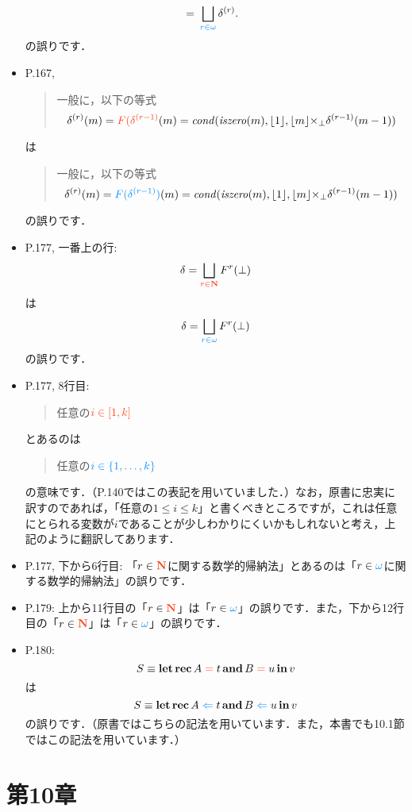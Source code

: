 \documentclass[12pt,titlepage,twoside,openright,dvipdfmx]{jsbook}
\newcommand\old[1]{%
  \textcolor[rgb]{1.0,0.25,0.1}{#1}%
  }
\newcommand\new[1]{%
  \textcolor[rgb]{0,0.55,1.0}{#1}%
  }
\theoremstyle{definition}
\begin{document}
\begin{itemize}
\begin{align*}
    ~=~ & \bigsqcup_{\new{r \in \omega}} \delta^{(r)}.
  \end{align*}
  の誤りです．
\item P.167,
  \begin{quote}
    一般に，以下の等式
    \[
      \delta^{(r)}(m) = \old{F(\delta^{(r-1)}}(m) = \SEMCOND(\ISZERO(m),\valuize{1},\valuize{m} \strict{\times} \delta^{(r-1)}(m-1))\\
    \]
  \end{quote}
  は
  \begin{quote}
    一般に，以下の等式
    \[
      \delta^{(r)}(m) = \new{F(\delta^{(r-1)})}(m) = \SEMCOND(\ISZERO(m),\valuize{1},\valuize{m} \strict{\times} \delta^{(r-1)}(m-1))\\
    \]
  \end{quote}
  の誤りです．
\item P.177, 一番上の行:
  \[
    \delta = \bigsqcup_{\old{r \in \NUM}} F^r(\bot)
  \]
  は
  \[
    \delta = \bigsqcup_{\new{r \in \omega}} F^r(\bot)
  \]
  の誤りです．
\item P.177, 8行目:
  \begin{quote}
    任意の$\old{i \in [1,k]}$
  \end{quote}
  とあるのは
  \begin{quote}
    任意の$\new{i \in \set{1,\dots,k}}$
  \end{quote}
  の意味です．（P.140ではこの表記を用いていました．）なお，原書に忠実に訳すのであれば，「任意の$1 \le i \le k$」と書くべきところですが，これは任意にとられる変数が$i$であることが少しわかりにくいかもしれないと考え，上記のように翻訳してあります．
\item P.177, 下から6行目:
  「$r \in \old{\NUM}$に関する数学的帰納法」とあるのは「$r \in \new{\omega}$に関する数学的帰納法」の誤りです．
\item P.179:
  上から11行目の「$r \in \old{\NUM}$」は「$r \in \new{\omega}$」の誤りです．また，下から12行目の「$r \in \old{\NUM}$」は「$r \in \new{\omega}$」の誤りです．
\item P.180:
  \[
    S \equiv \BFLET \BFREC A \old{{}={}} t \BFAND B \old{{}={}} u \BFIN v
  \]
  は
  \[
    S \equiv \BFLET \BFREC A \new{{}\Leftarrow{}} t \BFAND B \new{{}\Leftarrow{}} u \BFIN v
  \]
  の誤りです．（原書ではこちらの記法を用いています．また，本書でも10.1節ではこの記法を用いています．）
\end{itemize}
\fi
\fi

\section*{第10章}
\end{document}
